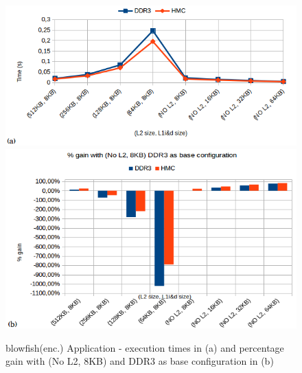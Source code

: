 \documentclass{sig-alternate-05-2015}
\begin{document}
\begin{figure}
	\centering
\includegraphics[scale=0.38]{images/graficos/blowfish_}\includegraphics[scale=0.38]{images/graficos/blowfish_perc__}

\caption{\label{fig:blowfish(enc.)-Application}blowfish(enc.) Application
- execution times in (a) and percentage gain with (No L2, 8KB) and DDR3
as base configuration in (b)}
\end{figure}
\end{document}
